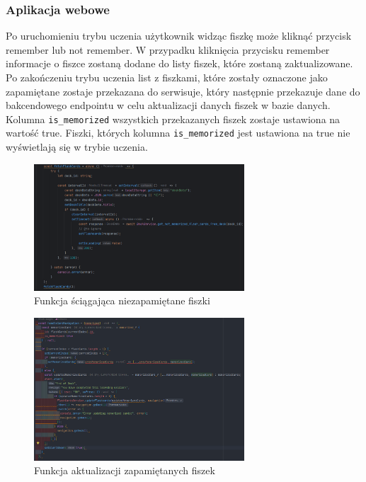 \subsubsection{Aplikacja webowe}

Po uruchomieniu trybu uczenia użytkownik widząc fiszkę może kliknąć przycisk remember lub not remember. W przypadku kliknięcia przycisku remember informacje o fiszce zostaną dodane do listy fiszek, które zostaną zaktualizowane. Po zakończeniu trybu uczenia list z fiszkami, które zostały oznaczone jako zapamiętane zostaje przekazana do serwisuje, który następnie przekazuje dane do bakcendowego endpointu w celu aktualizacji danych fiszek w bazie danych. Kolumna \texttt{is_memorized} wszystkich przekazanych fiszek zostaje ustawiona na wartość true. Fiszki, których kolumna \texttt{is_memorized} jest ustawiona na true nie wyświetlają się w trybie uczenia.

\begin{figure}[H]
    \centering
    \includegraphics[width=0.7\textwidth]{chapters/chapter_8/screens/get_unmemorized_flash_cards_web}
    \caption{Funkcja ściągająca niezapamiętane fiszki}
    \label{img:get_unmemorized_flash_cards_web}
\end{figure}

\begin{figure}[H]
    \centering
    \includegraphics[width=0.7\textwidth]{chapters/chapter_8/screens/pass_unmemorized_flash_cards_web}
    \caption{Funkcja aktualizacji zapamiętanych fiszek}
    \label{img:pass_unmemorized_flash_cards_web}
\end{figure}

